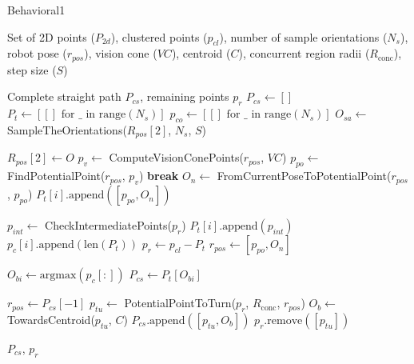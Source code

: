 \begin{algorithm}[H]
    \caption{Behavioral1}
    \label{alg:behavioral1}
    \begin{algorithmic}[1]

    \Require Set of 2D points ($P_{2d}$), clustered points ($p_{cl}$), number of sample orientations ($N_s$), robot pose ($r_{pos}$), vision cone ($VC$), centroid ($C$), concurrent region radii ($R_{\text{conc}}$), step size ($S$)

    \Ensure Complete straight path $P_{cs}$, remaining points $p_r$
    \State $P_{cs} \leftarrow []$
    \State $P_t \leftarrow [[] \text{ for } \_ \text{ in range}(N_s)]$
    \State $p_{co} \leftarrow [[] \text{ for } \_ \text{ in range}(N_s)]$
    \State $O_{sa} \leftarrow$ SampleTheOrientations($R_{pos}[2]$, $N_s$, $S$)
    
        \State $R_{pos}[2] \leftarrow O$
            \State $p_v \leftarrow$ ComputeVisionConePoints($r_{pos}$, $VC$)
            \State $p_{po} \leftarrow$ FindPotentialPoint($r_{pos}$, $p_v$)
                \State \textbf{break}
            \EndIf
            \State $O_n \leftarrow$ FromCurrentPoseToPotentialPoint($r_{pos}$, $p_{po}$)
            \State $P_t[i].\text{append}([p_{po}, O_n])$
            
            \State $p_{int} \leftarrow$ CheckIntermediatePoints($p_r$)
            \State $P_t[i].\text{append}(p_{int})$
            \State $p_c[i].\text{append}(\text{len}(P_t))$
            \State $p_r \leftarrow p_{cl} - P_t$
            \State $r_{pos} \leftarrow [p_{po}, O_n]$
        \EndWhile
    \EndFor
    
    \State $O_{bi} \leftarrow \text{argmax}(p_c[:])$
    \State $P_{cs} \leftarrow P_t[O_{bi}]$
    
    \State $r_{pos} \leftarrow P_{cs}[-1]$
    \State $p_{tu} \leftarrow$ PotentialPointToTurn($p_r$, $R_{\text{conc}}$, $r_{pos}$)
    \State $O_b \leftarrow$ TowardsCentroid($p_{tu}$, $C$)
    \State $P_{cs}.\text{append}([p_{tu}, O_b])$
    \State $p_r.\text{remove}([p_{tu}])$
    
    \State \Return $P_{cs}$, $p_r$
    \end{algorithmic}
    \end{algorithm}
    

    


